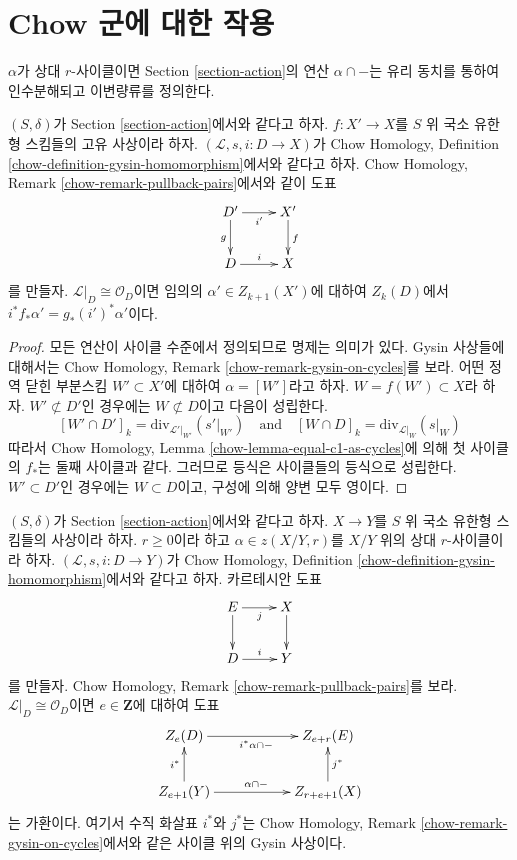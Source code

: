 \section{Chow 군에 대한 작용}
\label{section-action-chow}

\noindent
$\alpha$가 상대 $r$-사이클이면 Section \ref{section-action}의 연산
$\alpha \cap -$는 유리 동치를 통하여 인수분해되고 이변량류를
정의한다.

\begin{lemma}
\label{lemma-closed-in-X-gysin}
$(S, \delta)$가 Section \ref{section-action}에서와 같다고 하자.
$f : X' \to X$를 $S$ 위 국소 유한형 스킴들의 고유 사상이라 하자.
$(\mathcal{L}, s, i : D \to X)$가 Chow Homology, Definition
\ref{chow-definition-gysin-homomorphism}에서와 같다고 하자. Chow
Homology, Remark \ref{chow-remark-pullback-pairs}에서와 같이 도표
$$
\xymatrix{
D' \ar[d]_g \ar[r]_{i'} & X' \ar[d]^f \\
D \ar[r]^i & X
}
$$
를 만들자. $\mathcal{L}|_D \cong \mathcal{O}_D$이면 임의의
$\alpha' \in Z_{k + 1}(X')$에 대하여 $Z_k(D)$에서
$i^*f_*\alpha' = g_*(i')^*\alpha'$이다.
\end{lemma}

\begin{proof}
모든 연산이 사이클 수준에서 정의되므로 명제는 의미가 있다. Gysin
사상들에 대해서는 Chow Homology, Remark
\ref{chow-remark-gysin-on-cycles}를 보라. 어떤 정역 닫힌 부분스킴
$W' \subset X'$에 대하여 $\alpha = [W']$라고 하자.
$W = f(W') \subset X$라 하자. $W' \not \subset D'$인 경우에는
$W \not \subset D$이고 다음이 성립한다.
$$
[W' \cap D']_k = \text{div}_{\mathcal{L}'|_{W'}}({s'|_{W'}})
\quad\text{and}\quad
[W \cap D]_k = \text{div}_{\mathcal{L}|_W}(s|_W)
$$
따라서 Chow Homology, Lemma \ref{chow-lemma-equal-c1-as-cycles}에 의해
첫 사이클의 $f_*$는 둘째 사이클과 같다. 그러므로 등식은 사이클들의
등식으로 성립한다. $W' \subset D'$인 경우에는 $W \subset D$이고,
구성에 의해 양변 모두 영이다.
\end{proof}

\begin{lemma}
\label{lemma-action-gysin}
$(S, \delta)$가 Section \ref{section-action}에서와 같다고 하자.
$X \to Y$를 $S$ 위 국소 유한형 스킴들의 사상이라 하자.
$r \geq 0$이라 하고 $\alpha \in z(X/Y, r)$를 $X/Y$ 위의 상대
$r$-사이클이라 하자. $(\mathcal{L}, s, i : D \to Y)$가 Chow Homology,
Definition \ref{chow-definition-gysin-homomorphism}에서와 같다고 하자.
카르테시안 도표
$$
\xymatrix{
E \ar[d] \ar[r]_j & X \ar[d] \\
D \ar[r]^i & Y
}
$$
를 만들자. Chow Homology, Remark \ref{chow-remark-pullback-pairs}를 보라.
$\mathcal{L}|_D \cong \mathcal{O}_D$이면 $e \in \mathbf{Z}$에 대하여
도표
$$
\xymatrix{
Z_e(D) \ar[rr]_{i^*\alpha \cap -} & &
Z_{e + r}(E) \\
Z_{e + 1}(Y) \ar[u]^{i^*} \ar[rr]^{\alpha \cap -} & &
Z_{r + e + 1}(X) \ar[u]_{j^*}
}
$$
는 가환이다. 여기서 수직 화살표 $i^*$와 $j^*$는 Chow Homology,
Remark \ref{chow-remark-gysin-on-cycles}에서와 같은 사이클 위의 Gysin
사상이다.
\end{lemma}

